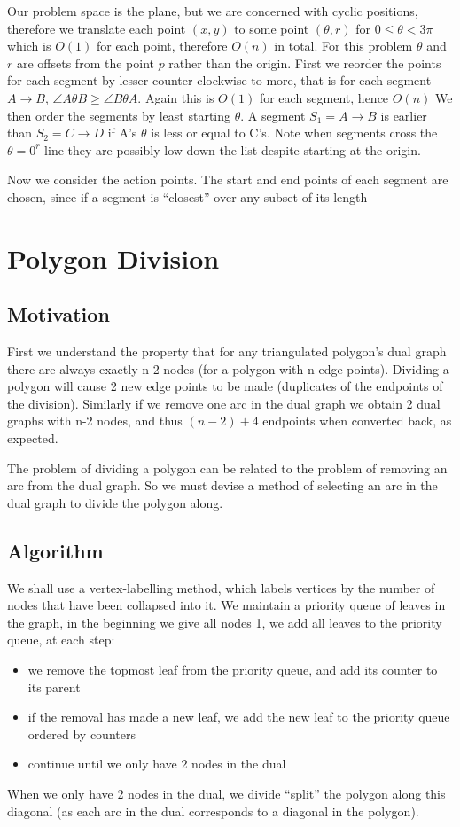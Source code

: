 Our problem space is the plane, but we are concerned with cyclic positions, therefore we translate each point $(x,y)$ to some point $(\theta, r)$ for $0 \leq \theta < 3\pi$ which is $O(1)$ for each point, therefore $O(n)$ in total.
For this problem $\theta$ and $r$ are offsets from the point $p$ rather than the origin.
First we reorder the points for each segment by lesser counter-clockwise to more, that is for each segment $A \rightarrow B$, $\angle A \theta B \geq \angle B \theta A$.  Again this is $O(1)$ for each segment, hence $O(n)$
We then order the segments by least starting $\theta$.  A segment $S_1 = A \rightarrow B$ is earlier than $S_2 = C \rightarrow D$ if A's $\theta$ is less or equal to C's.
Note when segments cross the $\theta = 0^r$ line they are possibly low down the list despite starting at  the origin.

Now we consider the action points.
The start and end points of each segment are chosen, since if a segment is ``closest'' over any subset of its length


\section {Polygon Division}
\subsection{Motivation}
First we understand the property that for any triangulated polygon's dual graph there are always exactly n-2 nodes (for a polygon with n edge points).
Dividing a polygon will cause 2 new edge points to be made (duplicates of the endpoints of the division).
Similarly if we remove one arc in the dual graph we obtain 2 dual graphs with n-2 nodes, and thus $(n-2)+4$ endpoints when converted back, as expected.

The problem of dividing a polygon can be related to the problem of removing an arc from the dual graph.
So we must devise a method of selecting an arc in the dual graph to divide the polygon along.

\subsection{Algorithm}
We shall use a vertex-labelling method, which labels vertices by the number of nodes that have been collapsed into it.
We maintain a priority queue of leaves in the graph, in the beginning we give all nodes 1, we add all leaves to the priority queue, at each step:
\begin{itemize}
	\item we remove the topmost leaf from the priority queue, and add its counter to its parent
	\item if the removal has made a new leaf, we add the new leaf to the priority queue ordered by counters
	\item continue until we only have 2 nodes in the dual
\end{itemize}
When we only have 2 nodes in the dual, we divide ``split'' the polygon along this diagonal (as each arc in the dual corresponds to a diagonal in the polygon).

